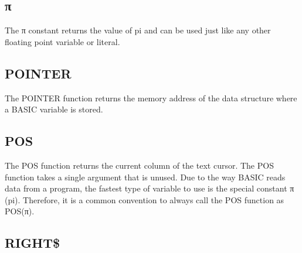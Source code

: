 \subsection{\ttfamily π}

The {\ttfamily π} constant returns the value of pi and can be used just like
any other floating point variable or literal.\\


\subsection{POINTER}

The {\ttfamily POINTER} function returns the memory address of the data
structure where a BASIC variable is stored.\\


\subsection{POS}

The {\ttfamily POS} function returns the current column of the text cursor.
The {\ttfamily POS} function takes a single argument that is unused.  Due to
the way BASIC reads data from a program, the fastest type of variable to use is
the special constant {\ttfamily π} (pi).  Therefore, it is a common convention
to always call the {\ttfamily POS} function as {\ttfamily POS(π)}.\\


\subsection{RIGHT\$}

